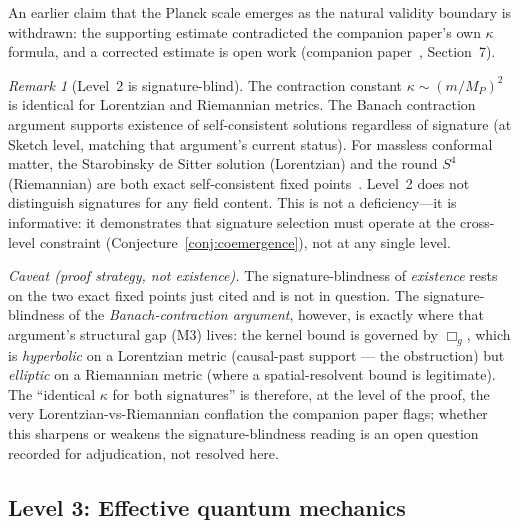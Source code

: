 \documentclass[12pt,a4paper]{article}
\theoremstyle{definition}
\theoremstyle{remark}
\newtheorem{remark}{Remark}
\begin{document}
An earlier claim that the Planck scale emerges as the natural validity
boundary is withdrawn: the supporting estimate contradicted the companion
paper's own $\kappa$ formula, and a corrected estimate is open work
(companion paper~\cite{fixed_point}, Section~7).

\begin{remark}[Level~2 is signature-blind]
\label{rem:signature_blind}
The contraction constant $\kappa \sim (m/M_P)^2$ is identical for
Lorentzian and Riemannian metrics. The Banach contraction argument
supports existence of self-consistent solutions regardless of signature
(at Sketch level, matching that argument's current status). For
massless conformal matter, the Starobinsky de Sitter solution
(Lorentzian) and the round $S^4$ (Riemannian) are both exact
self-consistent fixed points~\cite{starobinsky,bunch_davies}. Level~2
does not distinguish signatures for any field content. This is not a
deficiency---it is informative: it demonstrates that signature selection
must operate at the cross-level constraint
(Conjecture~\ref{conj:coemergence}), not at any single level.

\emph{Caveat (proof strategy, not existence).} The signature-blindness of
\emph{existence} rests on the two exact fixed points just cited and is not in
question. The signature-blindness of the \emph{Banach-contraction argument},
however, is exactly where that argument's structural gap (M3) lives: the kernel
bound is governed by $\Box_g$, which is \emph{hyperbolic} on a Lorentzian metric
(causal-past support --- the obstruction) but \emph{elliptic} on a Riemannian
metric (where a spatial-resolvent bound is legitimate). The ``identical $\kappa$
for both signatures'' is therefore, at the level of the proof, the very
Lorentzian-vs-Riemannian conflation the companion paper flags; whether this
sharpens or weakens the signature-blindness reading is an open question recorded
for adjudication, not resolved here.
\end{remark}

\subsection{Level 3: Effective quantum mechanics}
\label{sec:level3}
\end{document}
